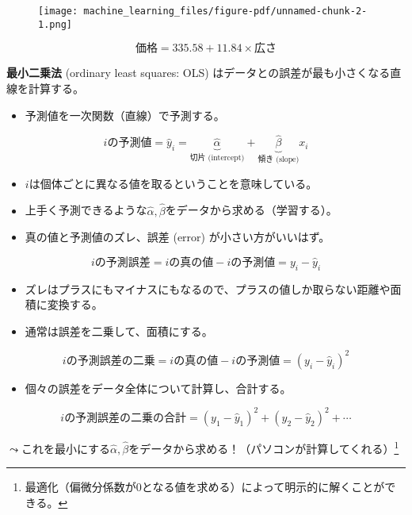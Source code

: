 \documentclass[
  xelatex,
  ja=standard]{bxjsarticle}
\providecommand{\tightlist}{%
  \setlength{\itemsep}{0pt}\setlength{\parskip}{0pt}}\usepackage{longtable,booktabs,array}
\begin{document}
\begin{figure}[htpb]

{\centering \texttt{[image: machine\_learning\_files/figure-pdf/unnamed-chunk-2-1.png]}

}

\end{figure}

\[
価格 = 335.58 + 11.84 \times 広さ
\]

\textbf{最小二乗法} (ordinary least squares: OLS)
はデータとの誤差が最も小さくなる直線を計算する。

\begin{itemize}
\tightlist
\item
  予測値を一次関数（直線）で予測する。
\end{itemize}

\[
i\textrm{の予測値} = \hat{y}_i = \underbrace{\hat{\alpha}}_{\textrm{切片 (intercept)}} 
+ \underbrace{\hat{\beta}}_{\textrm{傾き (slope)}} x_i
\]

\begin{itemize}
\tightlist
\item
  \(i\)は個体ごとに異なる値を取るということを意味している。
\item
  上手く予測できるような\(\hat{\alpha}, \hat{\beta}\)をデータから求める（学習する）。
\item
  真の値と予測値のズレ、誤差 (error) が小さい方がいいはず。
\end{itemize}

\[
i\textrm{の予測誤差} = i\textrm{の真の値} - i\textrm{の予測値} = y_i - \hat{y}_i
\]

\begin{itemize}
\tightlist
\item
  ズレはプラスにもマイナスにもなるので、プラスの値しか取らない距離や面積に変換する。
\item
  通常は誤差を二乗して、面積にする。
\end{itemize}

\[
i\textrm{の予測誤差の二乗} = i\textrm{の真の値} - i\textrm{の予測値} = (y_i - \hat{y}_i)^2
\]

\begin{itemize}
\tightlist
\item
  個々の誤差をデータ全体について計算し、合計する。
\end{itemize}

\[
i\textrm{の予測誤差の二乗の合計} = (y_1 - \hat{y}_1)^2 + (y_2 - \hat{y}_2)^2 + \cdots
\]

\(\leadsto\)これを最小にする\(\hat{\alpha}, \hat{\beta}\)をデータから求める！（パソコンが計算してくれる）\footnote{最適化（偏微分係数が0となる値を求める）によって明示的に解くことができる。}
\end{document}
